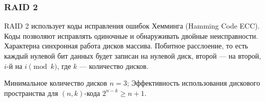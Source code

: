 \begin{frame}
    \frametitle{RAID 2}
    
    \begin{figure}
        \begin{center}
            \label{pict:raid2}
        \end{center}
    \end{figure} 
\end{frame}


RAID 2 использует коды исправления ошибок Хемминга (Hamming Code ECC). Коды позволяют исправлять одиночные и обнаруживать двойные неисправности. Характерна синхронная работа дисков массива. Побитное расслоение, то есть каждый нулевой бит данных будет записан на нулевой диск, второй --- на второй, $i$-й на $i\pmod k$, где $k$ --- количество дисков.

Минимальное количество дисков $n=3$; Эффективность использования дискового пространства для $(n,k)$-кода $2^{n-k}\geq n+1$.

